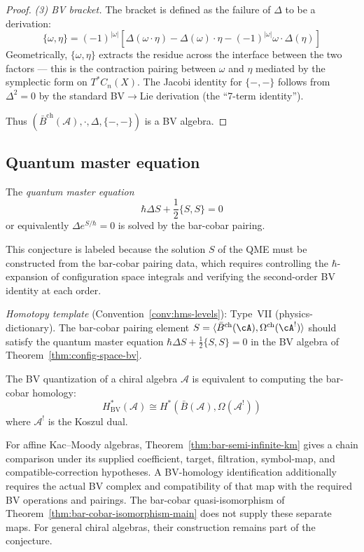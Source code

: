 \begin{proof}
\emph{(3) BV bracket.}
The bracket is defined as the failure of $\Delta$ to be a derivation:
\[
\{\omega, \eta\} = (-1)^{|\omega|}[\Delta(\omega \cdot \eta) - \Delta(\omega) \cdot \eta - (-1)^{|\omega|}\omega \cdot \Delta(\eta)]
\]
Geometrically, $\{\omega, \eta\}$ extracts the residue across the interface between the two factors — this is the contraction pairing between $\omega$ and $\eta$ mediated by the symplectic form on $T^*C_n(X)$.  The Jacobi identity for $\{-,-\}$ follows from $\Delta^2 = 0$ by the standard BV$\to$Lie derivation (the ``7-term identity'').

Thus $(\bar{B}^{\mathrm{ch}}(\mathcal{A}), \cdot, \Delta, \{-,-\})$ is a BV algebra.
\end{proof}

\subsection{Quantum master equation}

\begin{conjecture}
\label{conj:quantum-master-complete}
The \emph{quantum master equation}
\[\hbar \Delta S + \frac{1}{2}\{S, S\} = 0\]
or equivalently $\Delta e^{S/\hbar} = 0$
is solved by the bar-cobar pairing.
\end{conjecture}

\begin{remark}[Scope]
This conjecture is labeled \ClaimStatusHeuristic{} because the solution $S$ of
the QME must be constructed from the bar-cobar pairing data, which requires
controlling the $\hbar$-expansion of configuration space integrals and verifying
the second-order BV identity at each order.

\emph{Homotopy template} (Convention~\ref{conv:hms-levels}): Type~VII (physics-dictionary).
The bar-cobar pairing element $S = \langle \bar{B}^{\mathrm{ch}}(\cA), \Omega^{\mathrm{ch}}(\cA^!) \rangle$ should satisfy the quantum master equation $\hbar \Delta S + \tfrac{1}{2}\{S, S\} = 0$ in the BV algebra of Theorem~\ref{thm:config-space-bv}.
\end{remark}

\begin{conjecture}[BV quantization = bar-cobar duality; \ClaimStatusHeuristic]
\label{conj:bv-equals-bar-cobar}
The BV quantization of a chiral algebra $\mathcal{A}$ is equivalent to computing the
bar-cobar homology:
\[H^*_{\text{BV}}(\mathcal{A}) \cong H^*(\bar{B}(\mathcal{A}), \Omega(\mathcal{A}^!))\]
where $\mathcal{A}^!$ is the Koszul dual.

For affine Kac--Moody algebras, Theorem~\ref{thm:bar-semi-infinite-km} gives a chain comparison under its supplied coefficient, target, filtration, symbol-map, and compatible-correction hypotheses.
A BV-homology identification additionally requires the actual BV complex and compatibility of that map with the required BV operations and pairings.
The bar-cobar quasi-isomorphism of Theorem~\ref{thm:bar-cobar-isomorphism-main} does not supply these separate maps.
For general chiral algebras, their construction remains part of the conjecture.
\end{conjecture}

